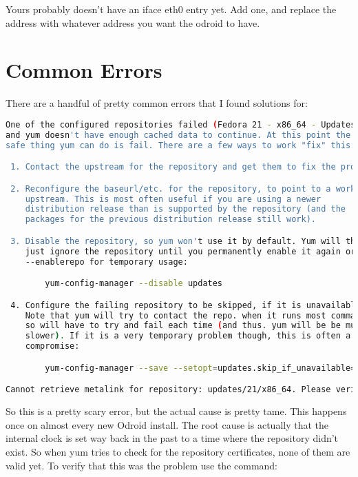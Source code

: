 Yours probably doesn't have an iface eth0 entry yet. Add one, and replace the address with whatever address you want the odroid to have.


\section{Common Errors}

There are a handful of pretty common errors that I found solutions for:

\begin{lstlisting}[language=bash]
  One of the configured repositories failed (Fedora 21 - x86_64 - Updates),
and yum doesn't have enough cached data to continue. At this point the only
safe thing yum can do is fail. There are a few ways to work "fix" this:

 1. Contact the upstream for the repository and get them to fix the problem.

 2. Reconfigure the baseurl/etc. for the repository, to point to a working
    upstream. This is most often useful if you are using a newer
    distribution release than is supported by the repository (and the
    packages for the previous distribution release still work).

 3. Disable the repository, so yum won't use it by default. Yum will then
    just ignore the repository until you permanently enable it again or use
    --enablerepo for temporary usage:

        yum-config-manager --disable updates

 4. Configure the failing repository to be skipped, if it is unavailable.
    Note that yum will try to contact the repo. when it runs most commands,
    so will have to try and fail each time (and thus. yum will be be much
    slower). If it is a very temporary problem though, this is often a nice
    compromise:

        yum-config-manager --save --setopt=updates.skip_if_unavailable=true

Cannot retrieve metalink for repository: updates/21/x86_64. Please verify its path and try again.	
\end{lstlisting}

So this is a pretty scary error, but the actual cause is pretty tame. This happens once on almost every new Odroid install. The root cause is actually that the internal clock is set way back in the past to a time where the repository didn't exist. So when yum tries to check for the repository certificates, none of them are valid yet. To verify that this was the problem use the command:

